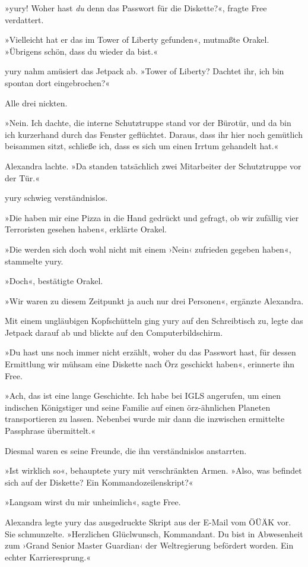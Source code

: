 »yury! Woher hast \emph{du} denn das Passwort für die Diskette?«, fragte Free verdattert.

»Vielleicht hat er das im Tower of Liberty gefunden«, mutmaßte Orakel. »Übrigens schön, dass du wieder da bist.«

yury nahm amüsiert das Jetpack ab. »Tower of Liberty? Dachtet ihr, ich bin spontan dort eingebrochen?«

Alle drei nickten.

»Nein. Ich dachte, die interne Schutztruppe stand vor der Bürotür, und da bin ich kurzerhand durch das Fenster geflüchtet. Daraus, dass ihr hier noch gemütlich beisammen sitzt, schließe ich, dass es sich um einen Irrtum gehandelt hat.«

Alexandra lachte. »Da standen tatsächlich zwei Mitarbeiter der Schutztruppe vor der Tür.«

yury schwieg verständnislos.

»Die haben mir eine Pizza in die Hand gedrückt und gefragt, ob wir zufällig vier Terroristen gesehen haben«, erklärte Orakel.

»Die werden sich doch wohl nicht mit einem ›Nein‹ zufrieden gegeben haben«, stammelte yury.

»Doch«, bestätigte Orakel.

»Wir waren zu diesem Zeitpunkt ja auch nur drei Personen«, ergänzte Alexandra.

Mit einem ungläubigen Kopfschütteln ging yury auf den Schreibtisch zu, legte das Jetpack darauf ab und blickte auf den Computerbildschirm.

»Du hast uns noch immer nicht erzählt, woher du das Passwort hast, für dessen Ermittlung wir mühsam eine Diskette nach Örz geschickt haben«, erinnerte ihn Free.

»Ach, das ist eine lange Geschichte. Ich habe bei IGLS angerufen, um einen indischen Königstiger und seine Familie auf einen örz-ähnlichen Planeten transportieren zu lassen. Nebenbei wurde mir dann die inzwischen ermittelte Passphrase übermittelt.«

Diesmal waren es seine Freunde, die ihn verständnislos anstarrten.

»Ist wirklich so«, behauptete yury mit verschränkten Armen. »Also, was befindet sich auf der Diskette? Ein Kommandozeilenskript?«

»Langsam wirst du mir unheimlich«, sagte Free.

Alexandra legte yury das ausgedruckte Skript aus der E-Mail vom ÖÜÄK vor. Sie schmunzelte. »Herzlichen Glüclwunsch, Kommandant. Du bist in Abwesenheit zum ›Grand Senior Master Guardian‹ der Weltregierung befördert worden. Ein echter Karrieresprung.«

